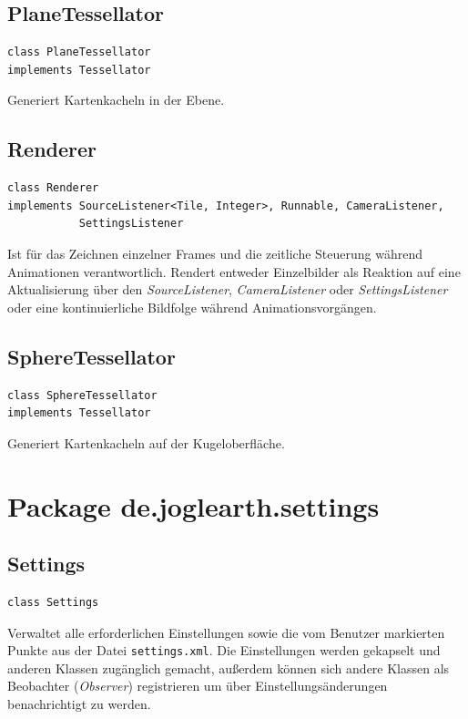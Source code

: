 \documentclass[10pt]{scrreprt}
\begin{document}
\vspace{5mm}
\subsection*{PlaneTessellator}
\begin{lstlisting}
class PlaneTessellator
implements Tessellator
\end{lstlisting}
Generiert Kartenkacheln in der Ebene.\\

\vspace{5mm}
\subsection*{Renderer}
\begin{lstlisting}
class Renderer
implements SourceListener<Tile, Integer>, Runnable, CameraListener,
           SettingsListener
\end{lstlisting}
Ist für das Zeichnen einzelner Frames und die zeitliche Steuerung während Animationen verantwortlich. Rendert entweder Einzelbilder als Reaktion auf eine Aktualisierung über den \textit{SourceListener}, \textit{CameraListener} oder \textit{SettingsListener} oder eine kontinuierliche Bildfolge während Animationsvorgängen.\\

\vspace{5mm}
\subsection*{SphereTessellator}
\begin{lstlisting}
class SphereTessellator
implements Tessellator
\end{lstlisting}
Generiert Kartenkacheln auf der Kugeloberfläche.\\




\vspace{5mm}
\section{Package de.joglearth.settings}
\subsection*{Settings}
\begin{lstlisting}
class Settings
\end{lstlisting}
Verwaltet alle erforderlichen Einstellungen sowie die vom Benutzer markierten Punkte aus der Datei \texttt{settings.xml}. Die Einstellungen werden gekapselt und anderen Klassen zugänglich gemacht, außerdem können sich andere Klassen als Beobachter (\textit{Observer}) registrieren um über Einstellungsänderungen benachrichtigt zu werden.\\
\end{document}
